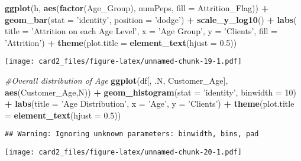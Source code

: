\documentclass[]{article}
\newenvironment{Shaded}{\begin{snugshade}}{\end{snugshade}}
\newcommand{\CommentTok}[1]{\textcolor[rgb]{0.56,0.35,0.01}{\textit{#1}}}
\newcommand{\DataTypeTok}[1]{\textcolor[rgb]{0.13,0.29,0.53}{#1}}
\newcommand{\DecValTok}[1]{\textcolor[rgb]{0.00,0.00,0.81}{#1}}
\newcommand{\FloatTok}[1]{\textcolor[rgb]{0.00,0.00,0.81}{#1}}
\newcommand{\KeywordTok}[1]{\textcolor[rgb]{0.13,0.29,0.53}{\textbf{#1}}}
\newcommand{\NormalTok}[1]{#1}
\newcommand{\OperatorTok}[1]{\textcolor[rgb]{0.81,0.36,0.00}{\textbf{#1}}}
\newcommand{\StringTok}[1]{\textcolor[rgb]{0.31,0.60,0.02}{#1}}
\begin{document}
\begin{Shaded}
\begin{Highlighting}[]
\KeywordTok{ggplot}\NormalTok{(h, }\KeywordTok{aes}\NormalTok{(}\KeywordTok{factor}\NormalTok{(Age_Group), numPeps, }\DataTypeTok{fill =}\NormalTok{ Attrition_Flag)) }\OperatorTok{+}\StringTok{ }\KeywordTok{geom_bar}\NormalTok{(}\DataTypeTok{stat =} \StringTok{'identity'}\NormalTok{, }\DataTypeTok{position =} \StringTok{'dodge'}\NormalTok{) }\OperatorTok{+}\StringTok{ }
\StringTok{  }\KeywordTok{scale_y_log10}\NormalTok{() }\OperatorTok{+}\StringTok{ }\KeywordTok{labs}\NormalTok{( }\DataTypeTok{title =} \StringTok{'Attrition on each Age Level'}\NormalTok{, }\DataTypeTok{x =} \StringTok{'Age Group'}\NormalTok{, }\DataTypeTok{y =} \StringTok{'Clients'}\NormalTok{, }\DataTypeTok{fill =} \StringTok{'Attrition'}\NormalTok{) }\OperatorTok{+}
\StringTok{  }\KeywordTok{theme}\NormalTok{(}\DataTypeTok{plot.title =} \KeywordTok{element_text}\NormalTok{(}\DataTypeTok{hjust =} \FloatTok{0.5}\NormalTok{))}
\end{Highlighting}
\end{Shaded}

\texttt{[image: card2\_files/figure-latex/unnamed-chunk-19-1.pdf]}

\begin{Shaded}
\begin{Highlighting}[]
\CommentTok{#Overall distribution of Age}
\KeywordTok{ggplot}\NormalTok{(df[, .N, Customer_Age], }\KeywordTok{aes}\NormalTok{(Customer_Age,N)) }\OperatorTok{+}\StringTok{ }\KeywordTok{geom_histogram}\NormalTok{(}\DataTypeTok{stat =} \StringTok{'identity'}\NormalTok{, }\DataTypeTok{binwidth =} \DecValTok{10}\NormalTok{) }\OperatorTok{+}\StringTok{ }
\StringTok{  }\KeywordTok{labs}\NormalTok{(}\DataTypeTok{title =} \StringTok{'Age Distribution'}\NormalTok{, }\DataTypeTok{x =} \StringTok{'Age'}\NormalTok{, }\DataTypeTok{y =} \StringTok{'Clients'}\NormalTok{) }\OperatorTok{+}\StringTok{ }\KeywordTok{theme}\NormalTok{(}\DataTypeTok{plot.title =} \KeywordTok{element_text}\NormalTok{(}\DataTypeTok{hjust =} \FloatTok{0.5}\NormalTok{))}
\end{Highlighting}
\end{Shaded}

\begin{verbatim}
## Warning: Ignoring unknown parameters: binwidth, bins, pad
\end{verbatim}

\texttt{[image: card2\_files/figure-latex/unnamed-chunk-20-1.pdf]}
\end{document}

